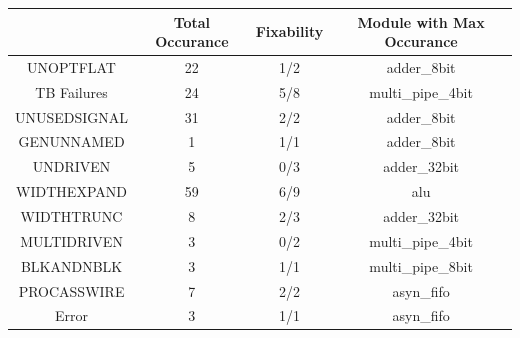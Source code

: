 \begin{tabular}{c|c|c|c}
\toprule
 & \bfseries Total Occurance & \bfseries Fixability & \bfseries Module with Max Occurance \\
\midrule
UNOPTFLAT & 22 & 1/2 & adder\_8bit \\ \midrule
TB Failures & 24 & 5/8 & multi\_pipe\_4bit \\ \midrule
UNUSEDSIGNAL & 31 & \color{black} {\cellcolor{lightblue}} 2/2 & adder\_8bit \\ \midrule
GENUNNAMED & \color{black} {\cellcolor{lightgreen}} 1 & \color{black} {\cellcolor{lightblue}} 1/1 & adder\_8bit \\ \midrule
UNDRIVEN & 5 & \color{black} {\cellcolor{lightgreen}} 0/3 & adder\_32bit \\ \midrule
WIDTHEXPAND & \color{black} {\cellcolor{lightblue}} 59 & 6/9 & alu \\ \midrule
WIDTHTRUNC & 8 & 2/3 & adder\_32bit \\ \midrule
MULTIDRIVEN & 3 & \color{black} {\cellcolor{lightgreen}} 0/2 & multi\_pipe\_4bit \\ \midrule
BLKANDNBLK & 3 & \color{black} {\cellcolor{lightblue}} 1/1 & multi\_pipe\_8bit \\ \midrule
PROCASSWIRE & 7 & \color{black} {\cellcolor{lightblue}} 2/2 & asyn\_fifo \\ \midrule
Error & 3 & \color{black} {\cellcolor{lightblue}} 1/1 & asyn\_fifo \\
\bottomrule
\end{tabular}
